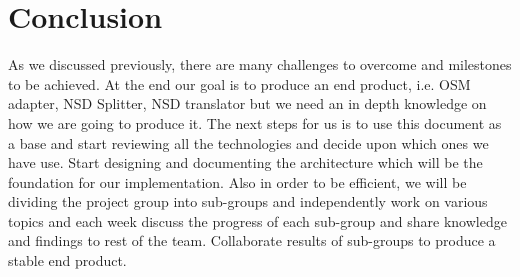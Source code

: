 \chapter{Conclusion}
\label{ch:Conclusion}
As we discussed previously, there are many challenges to overcome and milestones to be achieved.
At the end our goal is to produce an end product, i.e. OSM adapter, NSD Splitter, NSD translator but 
we need an in depth knowledge on how we are going to produce it. The next steps for us is to use this document as a base and start reviewing all the technologies and decide upon which ones we have use. Start designing and documenting the architecture which will be the foundation for our implementation.
Also in order to be efficient, we will be dividing the project group into sub-groups and independently work on various topics and each week discuss the progress of each sub-group and share knowledge and findings to rest of the team. Collaborate results of sub-groups to produce a stable end product. 
